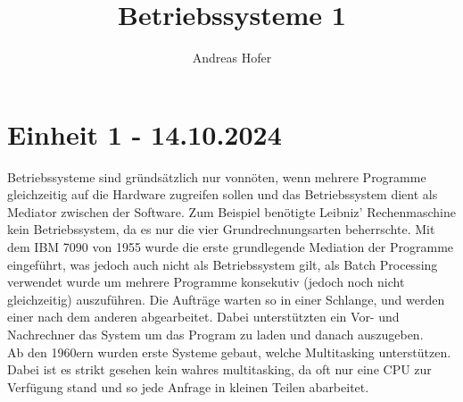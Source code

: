 \documentclass{article}
\title{\vspace{-1cm}Betriebssysteme 1}
\author{Andreas Hofer}
\begin{document}
	\maketitle
	\section{Einheit 1 - 14.10.2024}
	Betriebssysteme sind gründsätzlich nur vonnöten, wenn mehrere Programme gleichzeitig auf die Hardware zugreifen sollen und das Betriebssystem dient als Mediator zwischen der Software. Zum Beispiel benötigte Leibniz' Rechenmaschine kein Betriebssystem, da es nur die vier Grundrechnungsarten beherrschte. Mit dem IBM 7090 von 1955 wurde die erste grundlegende Mediation der Programme eingeführt, was jedoch auch nicht als Betriebssystem gilt, als Batch Processing verwendet wurde um mehrere Programme konsekutiv (jedoch noch nicht gleichzeitig) auszuführen. Die Aufträge warten so in einer Schlange, und werden einer nach dem anderen abgearbeitet. Dabei unterstützten ein Vor- und Nachrechner das System um das Program zu laden und danach auszugeben. \\
	Ab den 1960ern wurden erste Systeme gebaut, welche Multitasking unterstützen. Dabei ist es strikt gesehen kein wahres multitasking, da oft nur eine CPU zur Verfügung stand und so jede Anfrage in kleinen Teilen abarbeitet. 
\end{document}
